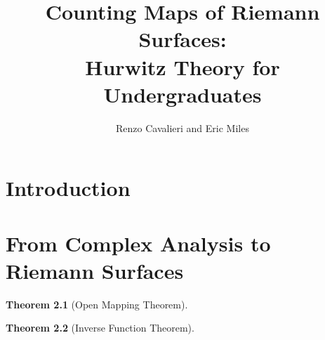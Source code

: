 \documentclass[12pt]{book}%
\theoremstyle{plain}
\newtheorem{theorem}{Theorem}[section]
\theoremstyle{definition}
\theoremstyle{remark}
\begin{document}
\title{Counting Maps of Riemann Surfaces: \\ Hurwitz Theory for Undergraduates}

\author{Renzo Cavalieri and Eric Miles}

\date{}

\maketitle





\tableofcontents



\chapter{Introduction}
\label{introduction}






\chapter{From Complex Analysis to Riemann Surfaces}
\label{complexAnalysis}



\begin{theorem}[Open Mapping Theorem]
\label{openMappingThm}
\end{theorem}



\begin{theorem}[Inverse Function Theorem]
\label{inverseFunctionThm}
\end{theorem}






\end{document}
